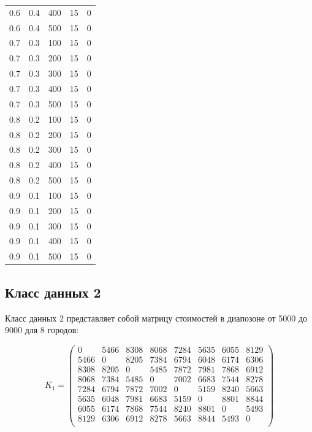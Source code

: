 \begin{center}
\begin{longtable}[c]{|c|c|c|c|c|}
 0.6 &  0.4 &  400 &    15 &     0 \\
 0.6 &  0.4 &  500 &    15 &     0 \\
\hline
 0.7 &  0.3 &  100 &    15 &     0 \\
 0.7 &  0.3 &  200 &    15 &     0 \\
 0.7 &  0.3 &  300 &    15 &     0 \\
 0.7 &  0.3 &  400 &    15 &     0 \\
 0.7 &  0.3 &  500 &    15 &     0 \\
\hline
 0.8 &  0.2 &  100 &    15 &     0 \\
 0.8 &  0.2 &  200 &    15 &     0 \\
 0.8 &  0.2 &  300 &    15 &     0 \\
 0.8 &  0.2 &  400 &    15 &     0 \\
 0.8 &  0.2 &  500 &    15 &     0 \\
\hline
 0.9 &  0.1 &  100 &    15 &     0 \\
 0.9 &  0.1 &  200 &    15 &     0 \\
 0.9 &  0.1 &  300 &    15 &     0 \\
 0.9 &  0.1 &  400 &    15 &     0 \\
 0.9 &  0.1 &  500 &    15 &     0 \\
\hline
\end{longtable}
\end{center}

\subsection{Класс данных 2}

Класс данных 2 представляет собой матрицу стоимостей в диапозоне от 5000 до 9000 для 8 городов:

\begin{equation}
    \label{eq:kd2}
	K_{1} = \begin{pmatrix}
		0 & 5466 & 8308 & 8068 & 7284 & 5635 & 6055 & 8129 \\
		5466 & 0 & 8205 & 7384 & 6794 & 6048 & 6174 & 6306 \\
		8308 & 8205 & 0 & 5485 & 7872 & 7981 & 7868 & 6912 \\
		8068 & 7384 & 5485 & 0 & 7002 & 6683 & 7544 & 8278 \\
		7284 & 6794 & 7872 & 7002 & 0 & 5159 & 8240 & 5663 \\
		5635 & 6048 & 7981 & 6683 & 5159 & 0 & 8801 & 8844 \\
		6055 & 6174 & 7868 & 7544 & 8240 & 8801 & 0 & 5493 \\
		8129 & 6306 & 6912 & 8278 & 5663 & 8844 & 5493 & 0 \\
	\end{pmatrix}
\end{equation}

